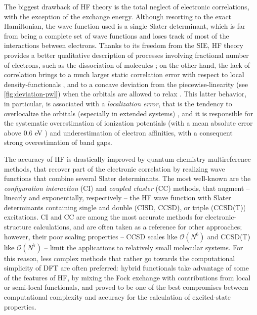 The biggest drawback of HF theory is the total neglect of electronic correlations, with the exception of the exchange energy. Although resorting to the exact Hamiltonian, the wave function used is a single Slater determinant, which is far from being a complete set of wave functions and loses track of most of the interactions between electrons. Thanks to its freedom from the SIE, HF theory provides a better qualitative description of processes involving fractional number of electrons, such as the dissociation of molecules \cite{ruzsinszky_spurious_2006}; on the other hand, the lack of correlation brings to a much larger static correlation error with respect to local density-functionals \cite{cohen_fractional-spins_2008}, and to a concave deviation from the piecewise-linearity (see \cref{fig:deviation-pwl}) when the orbitals are allowed to relax \cite{li_piecewise_2017}. This latter behavior, in particular, is associated with a \emph{localization error}, that is the tendency to overlocalize the orbitals (especially in extended systems) \cite{mori-sanchez_localization_2008}, and it is responsible for the systematic overestimation of ionization potentials (with a mean absolute error above 0.6 eV \cite{colonna_koopmans-compliant_2019}) and underestimation of electron affinities, with a consequent strong overestimation of band gaps.

The accuracy of HF is drastically improved by quantum chemistry multireference methods, that recover part of the electronic correlation by realizing wave functions that combine several Slater determinants. The most well-known are the \emph{configuration interaction} (CI) and \emph{coupled cluster} (CC) methods, that augment -- linearly and exponentially, respectively -- the HF wave function with Slater determinants containing single and double (CISD, CCSD), or triple (CCSD(T)) excitations. CI and CC are among the most accurate methods for electronic-structure calculations, and are often taken as a reference for other approaches; however, their poor scaling properties -- CCSD scales like $\mathcal{O}(N^6)$ and CCSD(T) like $\mathcal{O}(N^7)$ -- limit the applications to relatively small molecular systems. For this reason, less complex methods that rather go towards the computational simplicity of DFT are often preferred: hybrid functionals take advantage of some of the features of HF, by mixing the Fock exchange with contributions from local or semi-local functionals, and proved to be one of the best compromises between computational complexity and accuracy for the calculation of excited-state properties.

